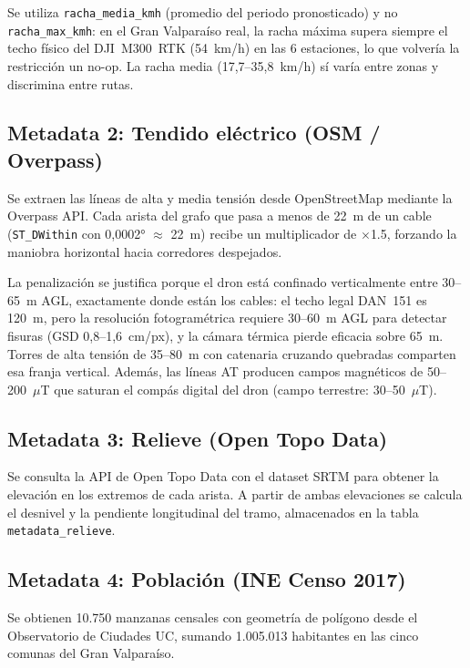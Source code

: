 \documentclass[conference]{IEEEtran}
\begin{document}
Se utiliza \texttt{racha\_media\_kmh} (promedio del periodo pronosticado) y no \texttt{racha\_max\_kmh}: en el Gran Valparaíso real, la racha máxima supera siempre el techo físico del DJI~M300~RTK (54~km/h) en las 6 estaciones, lo que volvería la restricción un no-op. La racha media (17,7--35,8~km/h) sí varía entre zonas y discrimina entre rutas.

\subsection{Metadata 2: Tendido eléctrico (OSM / Overpass)}

Se extraen las líneas de alta y media tensión desde OpenStreetMap mediante la Overpass API. Cada arista del grafo que pasa a menos de 22~m de un cable (\texttt{ST\_DWithin} con 0,0002° $\approx$ 22~m) recibe un multiplicador de $\times$1.5, forzando la maniobra horizontal hacia corredores despejados.

La penalización se justifica porque el dron está confinado verticalmente entre 30--65~m AGL, exactamente donde están los cables: el techo legal DAN~151 es 120~m, pero la resolución fotogramétrica requiere 30--60~m AGL para detectar fisuras (GSD 0,8--1,6~cm/px), y la cámara térmica pierde eficacia sobre 65~m. Torres de alta tensión de 35--80~m con catenaria cruzando quebradas comparten esa franja vertical. Además, las líneas AT producen campos magnéticos de 50--200~$\mu$T que saturan el compás digital del dron (campo terrestre: 30--50~$\mu$T).

\subsection{Metadata 3: Relieve (Open Topo Data)}

Se consulta la API de Open Topo Data con el dataset SRTM para obtener la elevación en los extremos de cada arista. A partir de ambas elevaciones se calcula el desnivel y la pendiente longitudinal del tramo, almacenados en la tabla \texttt{metadata\_relieve}.

\subsection{Metadata 4: Población (INE Censo 2017)}

Se obtienen 10.750 manzanas censales con geometría de polígono desde el Observatorio de Ciudades UC, sumando 1.005.013 habitantes en las cinco comunas del Gran Valparaíso.
\end{document}
